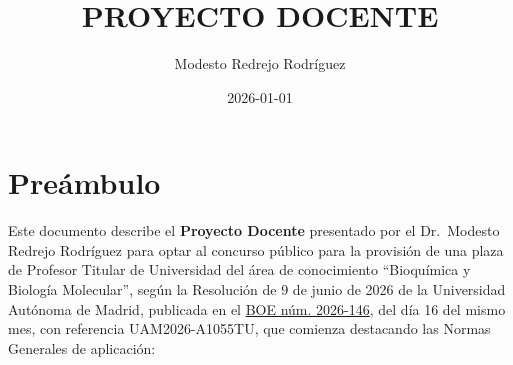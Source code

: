 \documentclass[
  11pt,
  a4paper,
  twoside]{scrreprt}
\title{PROYECTO DOCENTE}
\author{Modesto Redrejo Rodríguez}
\date{2026-01-01}
\renewcommand*\contentsname{Table of contents}
\newcommand\contentsname{Table of contents}
\begin{document}

\clearpage

\clearpage


\renewcommand*\contentsname{Contenido}
{
\setcounter{tocdepth}{2}
\tableofcontents
}
\listoffigures
\listoftables


\chapter{Preámbulo}\label{sec-preambulo}

Este documento describe el \textbf{Proyecto Docente} presentado por el
Dr.~Modesto Redrejo Rodríguez para optar al concurso público para la
provisión de una plaza de Profesor Titular de Universidad del área de
conocimiento ``Bioquímica y Biología Molecular'', según la Resolución de
9 de junio de 2026 de la Universidad Autónoma de Madrid, publicada en el
\href{https://www.boe.es/boe/dias/2026/06/16/}{BOE núm. 2026-146}, del
día 16 del mismo mes, con referencia UAM2026-A1055TU, que comienza
destacando las Normas Generales de aplicación:
\end{document}
